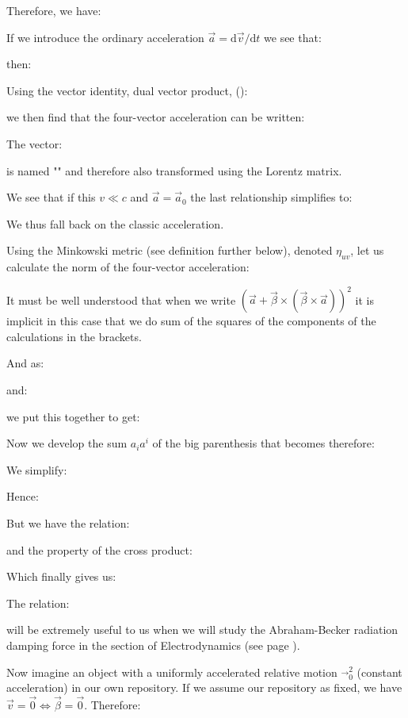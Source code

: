 	Therefore, we have:
	
	If we introduce the ordinary acceleration $\vec{a}=\mathrm{d}\vec{v}/\mathrm{d}t$ we see that:
	
	then:
	
	Using the vector identity, dual vector product, ():
	
	we then find that the four-vector acceleration can be written:
	
	
	The vector:
	
	is named "" and therefore also transformed using the Lorentz matrix.
	
	We see that if this $v\ll c$ and $\vec{a}=\vec{a}_0$ the last relationship simplifies to:
	
	We thus fall back on the classic acceleration.

	Using the Minkowski metric (see definition further below), denoted $\eta_{uv}$, let us calculate the norm of the four-vector acceleration:
	
	\begin{tcolorbox}[title=Remark,colframe=black,arc=10pt]
	It must be well understood that when we write $(\vec{a}+\vec{\beta}\times(\vec{\beta}\times\vec{a}))^2$ it is implicit in this case that we do sum of the squares of the components of the calculations in the brackets.
	\end{tcolorbox}	
	And as:
	
	and:
	
	we put this together to get:
	
	Now we develop the sum $a_ia^i$ of the big parenthesis that becomes therefore:
	
	We simplify:
	
	Hence:
	
	But we have the relation:
	
	and the property of the cross product:
	
	Which finally gives us:
	
	The relation\label{norm of relativistic acceleration}:
	
	will be extremely useful to us when we will study the Abraham-Becker radiation damping force in the section of Electrodynamics (see page \pageref{Abraham-Becker radiation damping force}).
	
	Now imagine an object with a uniformly accelerated relative motion $\vec{}_0^2$ (constant acceleration) in our own repository. If we assume our repository as fixed, we have $\vec{v}=\vec{0}\Leftrightarrow \vec{\beta}=\vec{0}$. Therefore:
	
